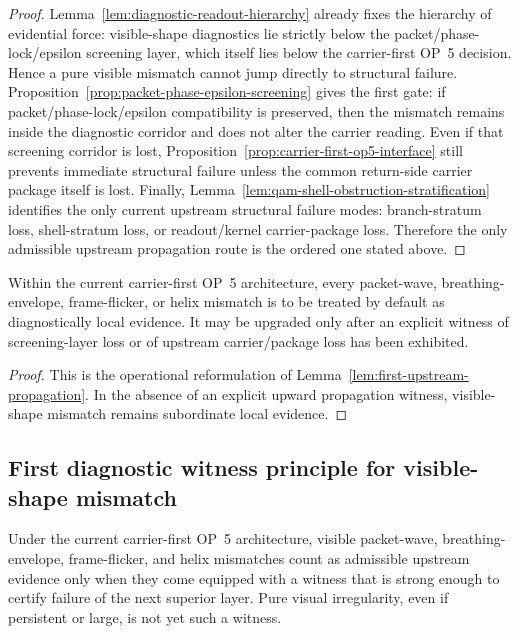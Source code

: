 \begin{proof}
Lemma~\ref{lem:diagnostic-readout-hierarchy} already fixes the hierarchy of evidential force: visible-shape diagnostics lie strictly below the packet/phase-lock/epsilon screening layer, which itself lies below the carrier-first OP~5 decision. Hence a pure visible mismatch cannot jump directly to structural failure. Proposition~\ref{prop:packet-phase-epsilon-screening} gives the first gate: if packet/phase-lock/epsilon compatibility is preserved, then the mismatch remains inside the diagnostic corridor and does not alter the carrier reading. Even if that screening corridor is lost, Proposition~\ref{prop:carrier-first-op5-interface} still prevents immediate structural failure unless the common return-side carrier package itself is lost. Finally, Lemma~\ref{lem:qam-shell-obstruction-stratification} identifies the only current upstream structural failure modes: branch-stratum loss, shell-stratum loss, or readout/kernel carrier-package loss. Therefore the only admissible upstream propagation route is the ordered one stated above.
\end{proof}

\begin{corollary}
\label{cor:visible-mismatch-nonpropagation}
Within the current carrier-first OP~5 architecture, every packet-wave, breathing-envelope, frame-flicker, or helix mismatch is to be treated by default as diagnostically local evidence. It may be upgraded only after an explicit witness of screening-layer loss or of upstream carrier/package loss has been exhibited.
\end{corollary}

\begin{proof}
This is the operational reformulation of Lemma~\ref{lem:first-upstream-propagation}. In the absence of an explicit upward propagation witness, visible-shape mismatch remains subordinate local evidence.
\end{proof}


\subsection{First diagnostic witness principle for visible-shape mismatch}
\label{sec:first-diagnostic-witness-principle}

\begin{remark}
Under the current carrier-first OP~5 architecture, visible packet-wave, breathing-envelope, frame-flicker, and helix mismatches count as admissible upstream evidence only when they come equipped with a witness that is strong enough to certify failure of the next superior layer. Pure visual irregularity, even if persistent or large, is not yet such a witness.
\end{remark}

